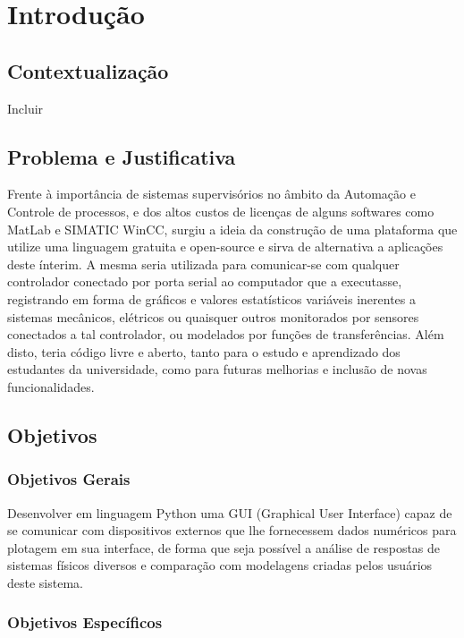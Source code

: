 \chapter{Introdução} \label{Chap:Introdução}

\section{Contextualização}

Incluir

\section{Problema e Justificativa}

Frente à importância de sistemas supervisórios no âmbito da Automação e Controle de processos, e dos altos custos de licenças de alguns softwares como MatLab e SIMATIC WinCC, surgiu a ideia da construção de uma plataforma que utilize uma linguagem gratuita e open-source e sirva de alternativa a aplicações deste ínterim. A mesma seria utilizada para comunicar-se com qualquer controlador conectado por porta serial ao computador que a executasse, registrando em forma de gráficos e valores estatísticos variáveis inerentes a sistemas mecânicos, elétricos ou quaisquer outros monitorados por sensores conectados a tal controlador, ou modelados por funções de transferências. Além disto, teria código livre e aberto, tanto para o estudo e aprendizado dos estudantes da universidade, como para futuras melhorias e inclusão de novas funcionalidades.

\section{Objetivos}

\subsection{Objetivos Gerais}

Desenvolver em linguagem Python uma GUI (Graphical User Interface) capaz de se comunicar com dispositivos externos que lhe fornecessem dados numéricos para plotagem em sua interface, de forma que seja possível a análise de respostas de sistemas físicos diversos e comparação com modelagens criadas pelos usuários deste sistema.

\subsection{Objetivos Específicos}

